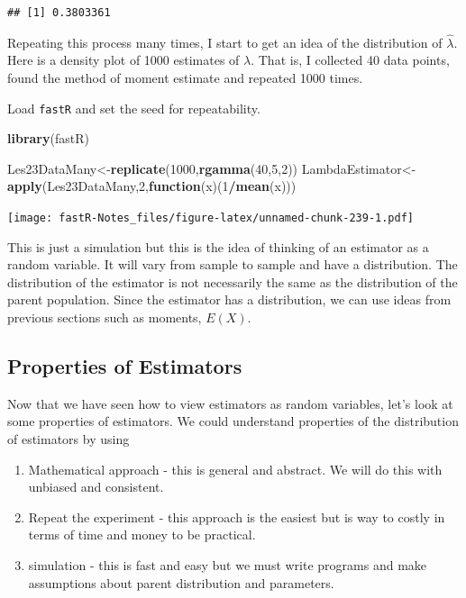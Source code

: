 \documentclass[]{book}
\newenvironment{Shaded}{\begin{snugshade}}{\end{snugshade}}
\newcommand{\KeywordTok}[1]{\textcolor[rgb]{0.13,0.29,0.53}{\textbf{#1}}}
\newcommand{\DecValTok}[1]{\textcolor[rgb]{0.00,0.00,0.81}{#1}}
\newcommand{\ControlFlowTok}[1]{\textcolor[rgb]{0.13,0.29,0.53}{\textbf{#1}}}
\newcommand{\OperatorTok}[1]{\textcolor[rgb]{0.81,0.36,0.00}{\textbf{#1}}}
\newcommand{\NormalTok}[1]{#1}
\providecommand{\tightlist}{%
  \setlength{\itemsep}{0pt}\setlength{\parskip}{0pt}}
\theoremstyle{definition}
\theoremstyle{definition}
\theoremstyle{definition}
\theoremstyle{remark}
\begin{document}
\begin{verbatim}
## [1] 0.3803361
\end{verbatim}

Repeating this process many times, I start to get an idea of the
distribution of \(\hat{\lambda}\). Here is a density plot of 1000
estimates of \(\lambda\). That is, I collected 40 data points, found the
method of moment estimate and repeated 1000 times.

Load \texttt{fastR} and set the seed for repeatability.

\begin{Shaded}
\begin{Highlighting}[]
\KeywordTok{library}\NormalTok{(fastR) }
\end{Highlighting}
\end{Shaded}

\begin{Shaded}
\begin{Highlighting}[]
\NormalTok{Les23DataMany<-}\KeywordTok{replicate}\NormalTok{(}\DecValTok{1000}\NormalTok{,}\KeywordTok{rgamma}\NormalTok{(}\DecValTok{40}\NormalTok{,}\DecValTok{5}\NormalTok{,}\DecValTok{2}\NormalTok{))}
\NormalTok{LambdaEstimator<-}\KeywordTok{apply}\NormalTok{(Les23DataMany,}\DecValTok{2}\NormalTok{,}\ControlFlowTok{function}\NormalTok{(x)(}\DecValTok{1}\OperatorTok{/}\KeywordTok{mean}\NormalTok{(x)))}
\end{Highlighting}
\end{Shaded}

\texttt{[image: fastR-Notes\_files/figure-latex/unnamed-chunk-239-1.pdf]}

This is just a simulation but this is the idea of thinking of an
estimator as a random variable. It will vary from sample to sample and
have a distribution. The distribution of the estimator is not
necessarily the same as the distribution of the parent population. Since
the estimator has a distribution, we can use ideas from previous
sections such as moments, \(E(X)\).

\subsection{Properties of Estimators}\label{properties-of-estimators}

Now that we have seen how to view estimators as random variables, let's
look at some properties of estimators. We could understand properties of
the distribution of estimators by using

\begin{enumerate}
\def\labelenumi{\arabic{enumi}.}
\tightlist
\item
  Mathematical approach - this is general and abstract. We will do this
  with unbiased and consistent.\\
\item
  Repeat the experiment - this approach is the easiest but is way to
  costly in terms of time and money to be practical.\\
\item
  simulation - this is fast and easy but we must write programs and make
  assumptions about parent distribution and parameters.
\end{enumerate}
\end{document}
